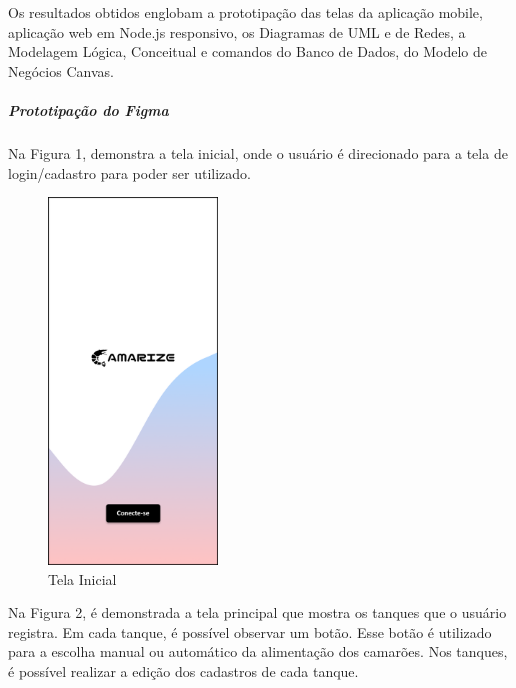 Os resultados obtidos englobam a prototipação das telas da aplicação mobile, aplicação web em Node.js responsivo, os Diagramas de UML e de Redes, a Modelagem Lógica, Conceitual e comandos do Banco de Dados, do Modelo de Negócios Canvas.

\subparagraph*{\textbf{Prototipação do Figma}}

Na Figura 1, demonstra a tela inicial, onde o usuário é direcionado para a tela de login/cadastro para poder ser utilizado.

\begin{figure}[!htb]
\centering
{}
\caption{Tela Inicial}%
\label{fig:tela-inicial}
\includegraphics[width = 0.4\textwidth]{Imagem/Tela_Inicial.png}
\end{figure}

\newpage

Na Figura 2, é demonstrada a tela principal que mostra os tanques que o usuário registra. Em cada tanque, é possível observar um botão. Esse botão é utilizado para a escolha manual ou automático da alimentação dos camarões. Nos tanques, é possível realizar a edição dos cadastros de cada tanque. 

